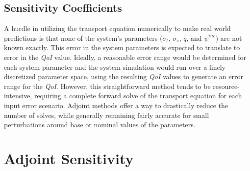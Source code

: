 \documentclass[12pt]{report}
\newcommand{\sigt}{\sigma_t}
\newcommand{\sigs}{\sigma_s}
\newcommand{\qoi}{{\it QoI}\xspace}
\begin{document}
\subsection{Sensitivity Coefficients}
A hurdle in utilizing the transport equation numerically to make real world predictions is that none of 
the system's parameters ($\sigt$, $\sigs$, $q$, and $\psi^{inc}$) are not known exactly. This error in 
the system parameters is expected to translate to error in the \qoi value. Ideally, a reasonable error 
range would be determined for each system parameter and the system simulation would run over a finely 
discretized parameter space, using the resulting \qoi values to generate an error range for the \qoi. 
However, this straightforward method tends to be resource-intensive, requiring a complete forward solve 
of the transport equation for each input error scenario. Adjoint methods offer a way to drastically 
reduce the number of solves, while generally remaining fairly accurate for small perturbations around 
base or nominal values of the parameters.

\section{Adjoint Sensitivity}
\end{document}
